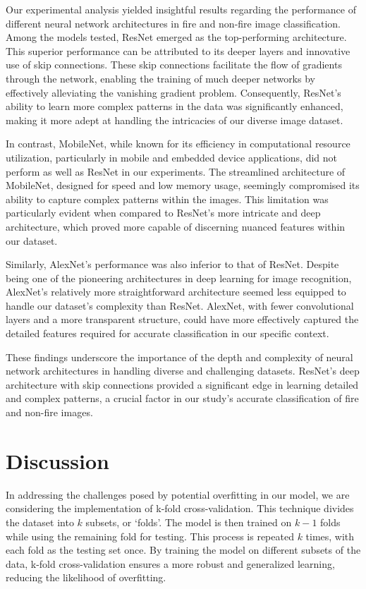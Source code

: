 Our experimental analysis yielded insightful results regarding the performance of different neural network architectures in fire and non-fire image classification. Among the models tested, ResNet emerged as the top-performing architecture. This superior performance can be attributed to its deeper layers and innovative use of skip connections. These skip connections facilitate the flow of gradients through the network, enabling the training of much deeper networks by effectively alleviating the vanishing gradient problem. Consequently, ResNet's ability to learn more complex patterns in the data was significantly enhanced, making it more adept at handling the intricacies of our diverse image dataset.

In contrast, MobileNet, while known for its efficiency in computational resource utilization, particularly in mobile and embedded device applications, did not perform as well as ResNet in our experiments. The streamlined architecture of MobileNet, designed for speed and low memory usage, seemingly compromised its ability to capture complex patterns within the images. This limitation was particularly evident when compared to ResNet's more intricate and deep architecture, which proved more capable of discerning nuanced features within our dataset.

Similarly, AlexNet's performance was also inferior to that of ResNet. Despite being one of the pioneering architectures in deep learning for image recognition, AlexNet's relatively more straightforward architecture seemed less equipped to handle our dataset's complexity than ResNet. AlexNet, with fewer convolutional layers and a more transparent structure, could have more effectively captured the detailed features required for accurate classification in our specific context.

These findings underscore the importance of the depth and complexity of neural network architectures in handling diverse and challenging datasets. ResNet's deep architecture with skip connections provided a significant edge in learning detailed and complex patterns, a crucial factor in our study's accurate classification of fire and non-fire images.


\section{Discussion}

In addressing the challenges posed by potential overfitting in our model, we are considering the implementation of k-fold cross-validation. This technique divides the dataset into \(k\) subsets, or `folds'. The model is then trained on \(k-1\) folds while using the remaining fold for testing. This process is repeated \(k\) times, with each fold as the testing set once. By training the model on different subsets of the data, k-fold cross-validation ensures a more robust and generalized learning, reducing the likelihood of overfitting.

